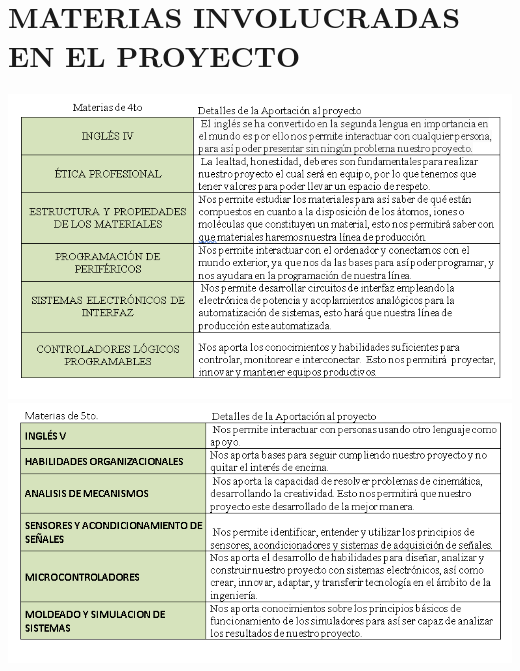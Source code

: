 \documentclass[11pt,a4paper]{article}
\begin{document}
\section{MATERIAS INVOLUCRADAS EN EL PROYECTO }
\includegraphics[scale=0.5]{71145735_653968975091118_3870654209674182656_n.png} \\\includegraphics[scale=0.5]{71089516_2412079752447274_7094167623637663744_n.png} 
\newpage

\\
\\
\end{document}
